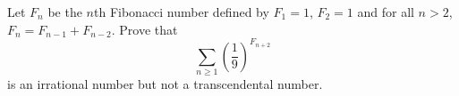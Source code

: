 \begin{problem}
    Let \( F_n \) be the \( n \)th Fibonacci number defined by \( F_1 = 1 \), \( F_2 = 1 \) and for all \( n > 2 \), \( F_n = F_{n-1} + F_{n-2} \). Prove that
    \[
        \sum_{n\geq 1}\left( \frac{1}{9}\right)^{F_{n+2}}
    \]
    is an irrational number but not a transcendental number.
\end{problem}
